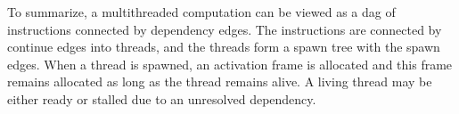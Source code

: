 \documentclass{article}
\begin{document}
To summarize, a multithreaded computation can be viewed as a dag of instructions connected by dependency edges. The instructions are connected by continue edges into threads, and the threads form a spawn tree with the spawn edges. When a thread is spawned, an activation frame is allocated and this frame remains allocated as long as the thread remains alive. A living thread may be either ready or stalled due to an unresolved dependency.
\end{document}
